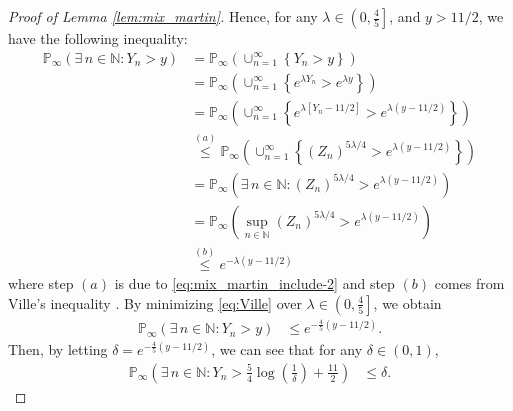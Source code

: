 \documentclass[12pt]{interact}
\newcommand{\lp}{\left(}
\newcommand{\rp}{\right)}
\newcommand{\lb}{\left[}
\newcommand{\rb}{\right]}
\newcommand{\lbp}{\left\{}
\newcommand{\rbp}{\right\}}
\newcommand{\mbb}{\mathbb}
\renewcommand{\Pr}{\mathbb{P}}
\theoremstyle{plain}
\begin{document}
\begin{proof} [Proof of Lemma \ref{lem:mix_martin}]
Hence, for any $\lambda\in\lp0,\frac{4}{5}\rb$, and $y > 11/2$, we have the following inequality:
%
\begin{align}\nonumber
    \Pr_{\infty}\lp\exists\,n\in\mbb{N}:Y_{n}>y\rp&=\Pr_{\infty}\lp\cup_{n=1}^{\infty}\lbp Y_{n}>y\rbp\rp\\\nonumber
    &=\Pr_{\infty}\lp\cup_{n=1}^{\infty}\lbp e^{\lambda Y_{n}}>e^{\lambda y}\rbp\rp\\\nonumber
    &=\Pr_{\infty}\lp\cup_{n=1}^{\infty}\lbp e^{\lambda\lb Y_{n} - 11/2\rb}>e^{\lambda\lp y - 11/2 \rp}\rbp\rp\\\nonumber
    &\overset{(a)}{\leq}\Pr_{\infty}\lp\cup_{n=1}^{\infty}\lbp\lp Z_{n}\rp^{5\lambda/4}>e^{\lambda \lp y - 11/2 \rp}\rbp\rp\\\nonumber
    &=\Pr_{\infty}\lp\exists\,n\in\mbb{N}:\lp Z_{n}\rp^{5\lambda/4}>e^{\lambda\lp y-11/2\rp}\rp\\\nonumber
    &=\Pr_{\infty}\lp \sup_{n \in \mbb{N}} \lp Z_{n}\rp^{5\lambda/4}>e^{\lambda\lp y-11/2\rp}\rp\\
    &\overset{(b)}{\leq}e^{-\lambda\lp y-11/2 \rp}\label{eq:Ville}
\end{align}
%
where step $(a)$ is due to \eqref{eq:mix_martin_include-2} and step $(b)$ comes from Ville's inequality \citep{ville1939etude}. By minimizing \eqref{eq:Ville} over $\lambda\in\lp0,\frac{4}{5}\rb$, we obtain
%
\begin{align}
    \Pr_{\infty}\lp\exists\,n\in\mbb{N}:Y_{n}>y\rp&\leq e^{-\frac{4}{5}\lp y-11/2 \rp}\label{eq:Minimize}.
\end{align}
%
Then, by letting $\delta=e^{-\frac{4}{5}\lp y-11/2 \rp}$, we can see that for any $\delta\in\lp0,1\rp$,
%
\begin{align}
    \Pr_{\infty}\lp\exists\,n\in\mbb{N}:Y_{n}>\frac{5}{4}\log\lp\frac{1}{\delta}\rp + \frac{11}{2} \rp&\leq\delta\label{eq:lemma-end}.
\end{align}
%
\end{proof}
\end{document}
